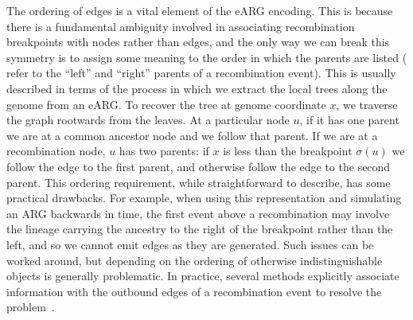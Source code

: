 \documentclass{article}
\begin{document}

The ordering of edges is a vital element of the eARG encoding.
This is because there is a fundamental ambiguity involved
in associating recombination breakpoints with nodes
rather than edges,
and the only way we can break this symmetry is to assign
some meaning to the order in which the parents are listed
(\cite{griffiths1997ancestral} refer to the ``left'' and ``right''
parents of a recombination event). This is usually described
in terms of the process in which we extract the local trees
along the genome from an eARG.
To recover
the tree at genome coordinate $x$,
we traverse the graph rootwards from the leaves. At a particular
node $u$, if it has one parent we are at a common ancestor
node and we follow that parent. If we are at a
recombination node, $u$ has two parents: if
$x$ is less than the breakpoint $\sigma(u)$ we follow
the edge to the first parent, and otherwise follow the edge
to the second parent.
This ordering requirement, while straightforward
to describe, has some practical drawbacks. For example,
when using this representation and simulating an ARG backwards in time,
the first event above a recombination may involve the lineage carrying the
ancestry to the right of the breakpoint rather
than the left, and so we cannot emit edges as they are generated.
Such issues can be worked around, but depending on the ordering of
otherwise indistinguishable objects is generally problematic. In practice,
several methods explicitly associate information with the outbound edges
of a recombination event
to resolve the problem~\citep{lyngso2005minimum,ignatieva2021kwarg}.
\end{document}
